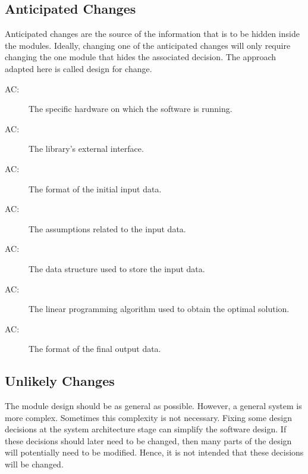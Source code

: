 \documentclass[12pt, titlepage]{article}
\newcounter{acnum}
\newcommand{\actheacnum}{AC\theacnum}
\begin{document}
\subsection{Anticipated Changes} \label{SecAchange}

Anticipated changes are the source of the information that is to be hidden
inside the modules. Ideally, changing one of the anticipated changes will only
require changing the one module that hides the associated decision. The approach
adapted here is called design for
change.

\begin{description}
\item[ \actheacnum \label{acHardware}:] The specific
  hardware on which the software is running.
  
\item[ \actheacnum \label{acInterface}:] The library's 
external interface.
  
\item[ \actheacnum \label{acInput}:] The format of the
  initial input data.
  
\item[ \actheacnum \label{acInputAssumption}:] The 
assumptions related to the input data. 

\item[ \actheacnum \label{acInputDataStructure}:] The 
data structure used to store the input data.

\item[ \actheacnum \label{acAlgorithm}:] The linear 
programming algorithm used to obtain the optimal solution.

\item[ \actheacnum \label{acOutput}:] The format of the 
final output data.
\end{description}

\subsection{Unlikely Changes} \label{SecUchange}

The module design should be as general as possible. However, a general system is
more complex. Sometimes this complexity is not necessary. Fixing some design
decisions at the system architecture stage can simplify the software design. If
these decisions should later need to be changed, then many parts of the design
will potentially need to be modified. Hence, it is not intended that these
decisions will be changed.
\end{document}
